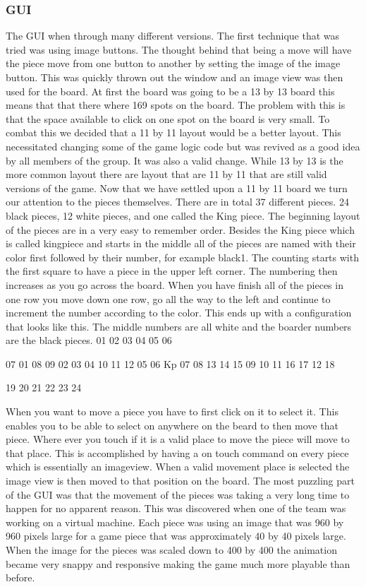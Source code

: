 \documentclass{article}
\begin{document}
\subsubsection{GUI}
	The GUI when through many different versions. The first technique that was tried was using image buttons. The thought behind that being a move will have the piece move from one button to another by setting the image of the image button. This was quickly thrown out the window and an image view was then used for the board. At first the board was going to be a 13 by 13 board this means that that there where 169 spots on the board. The problem with this is that the space available to click on one spot on the board is very small. To combat this we decided that a 11 by 11 layout would be a better layout. This necessitated changing some of the game logic code but was revived as a good idea by all members of the group. It was also a valid change. While 13 by 13 is the more common layout there are layout that are 11 by 11 that are still valid versions of the game. 
	Now that we have settled upon a 11 by 11 board we turn our attention to the pieces themselves. There are in total 37 different pieces. 24 black pieces, 12 white pieces, and one called the King piece.  The beginning layout of the pieces are in a very easy to remember order. Besides the King piece which is called kingpiece and starts in the middle all of the pieces are named with their color first followed by their number, for example black1. The counting starts with the first square to have a piece in the upper left corner. The numbering then increases as you go across the board. When you have finish all of the pieces in one row you move down one row, go all the way to the left and continue to increment the number according to the color. This ends up with a configuration that looks like this. The middle numbers are all white and the boarder numbers are the black pieces.
        01 02 03 04 05
              06
      
07            01            08
09         02 03 04         10
11 12   05 06 Kp 07 08   13 14
15         09 10 11         16
17            12            18

              19
        20 21 22 23 24

	When you want to move a piece you have to first click on it to select it. This enables you to be able to select on anywhere on the beard to then move that piece. Where ever you touch if it is a valid place to move the piece will move to that place. This is accomplished by having a on touch command on every piece which is essentially an imageview. When a valid movement place is selected the image view is then moved to that position on the board. The most puzzling part of the GUI was that the movement of the pieces was taking a very long time to happen for no apparent reason. This was discovered when one of the team was working on a virtual machine. Each piece was using an image that was 960 by 960 pixels large for a game piece that was approximately 40 by 40 pixels large. When the image for the pieces was scaled down to 400 by 400 the animation became very snappy and responsive making the game much more playable than before. 
\end{document}
